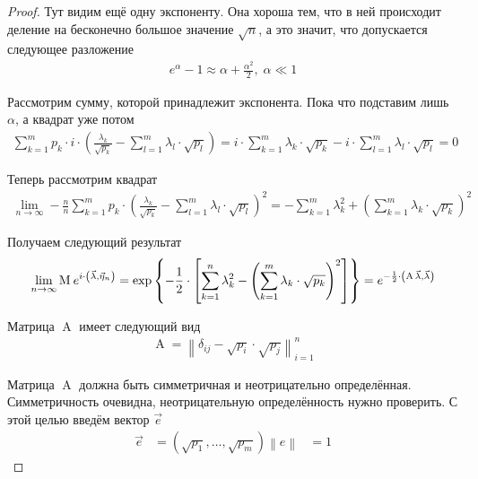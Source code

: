 \begin{proof}
    Тут видим ещё одну экспоненту. Она хороша тем, что в ней происходит деление
    на бесконечно большое значение $\sqrt{n}$, а это значит, что допускается
    следующее разложение
    \begin{align*}
        e^{\alpha} - 1 \approx \alpha + \frac{\alpha^2}{2},\; \alpha \ll 1
    \end{align*}

    Рассмотрим сумму, которой принадлежит экспонента. Пока что подставим лишь
    $\alpha$, а квадрат уже потом
    \begin{align*}
        \sum_{k=1}^{m} p_k \cdot i
             \cdot \left(\frac{\lambda_k}{\sqrt{p_k}}
                - \sum_{l=1}^{m}\lambda_l \cdot \sqrt{p_l} \right)
        = i \cdot \sum_{k=1}^{m} \lambda_k \cdot \sqrt{p_k}
            - i \cdot \sum_{l=1}^{m} \lambda_l \cdot \sqrt{p_l}
        = 0
    \end{align*}

    Теперь рассмотрим квадрат
    \begin{align*}
        \lim_{n \to \infty} -\frac{n}{n}\sum_{k=1}^{m} p_k
            \cdot \left( \frac{\lambda_k}{\sqrt{p_k}}
            - \sum_{l=1}^{m}\lambda_l \cdot \sqrt{p_l} \right)^2
        = - \sum_{k=1}^{m}\lambda_k^2
        + \left( \sum_{k=1}^{m}\lambda_k \cdot \sqrt{p_k} \right)^2
    \end{align*}

    Получаем следующий результат
    \begin{align*}
        \lim_{n \to \infty} \operatorname{M}_{} e^{
            i \cdot \left( \vec{\lambda}, \vec{\eta}_n \right)}
        = \exp{\left\{ - \frac{1}{2} \cdot \left[ \sum_{k=1}^{n}\lambda_k^2
                - \left( \sum_{k=1}^{m}\lambda_k \cdot \sqrt{p_k}
                    \right)^2\right] \right\}}
        = e^{-\frac{1}{2} \cdot \left(
                \operatorname{A} \vec{\lambda}, \vec{\lambda} \right)}
    \end{align*}

    Матрица $\operatorname{A}$ имеет следующий вид
    \begin{align*}
        \operatorname{A}
        = \left\| \delta_{ij} - \sqrt{p_i} \cdot \sqrt{p_j} \right\|_{i=1}^n
    \end{align*}

    Матрица $\operatorname{A}$ должна быть симметричная и неотрицательно
    определённая. Симметричность очевидна, неотрицательную определённость
    нужно проверить. С этой целью введём вектор $\vec{e}$
    \begin{align*}
        \vec{e} &= \left( \sqrt{p_1}, \dots, \sqrt{p_m} \right)
        \left\| e \right\| &= 1
    \end{align*}


\end{proof}
